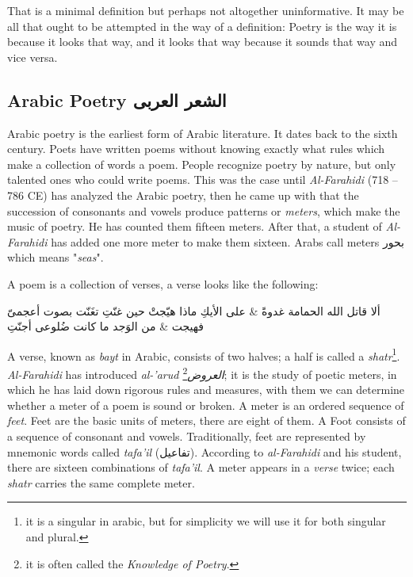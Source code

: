\documentclass[12pt]{report}
\begin{document}
That is a minimal definition but perhaps not altogether uninformative. It may be all that ought to be attempted in the way of a definition: Poetry is the way it is because it looks that way, and it looks that way because it sounds that way and vice versa.



\subsection{Arabic Poetry \textarabic{الشعر العربى}}
Arabic poetry is the earliest form of Arabic literature. It dates back to the sixth century. Poets have written poems without knowing exactly what rules which make a collection of words a poem. People recognize poetry by nature, but only talented ones who could write poems. %
This was the case until \textit{Al-Farahidi} (718 – 786 CE) has analyzed the
Arabic poetry, then he came up with that the succession of consonants and vowels
produce patterns or \textit{meters}, which make the music of poetry.  He has
counted them fifteen meters.  After that, a student of \textit{Al-Farahidi} has
added one more meter to make them sixteen. Arabs call meters \textarabic{بحور}
which means "\textit{seas}".

\bigskip

A poem is a collection of verses, a verse looks like the following:%

\vspace{0.5cm}
\begin{Arabic}
  \begin{traditionalpoem*}

    ألا قاتل الله الحمامة غدوةً \quad & \quad على الأيكِ ماذا هيّجتْ حين غنّتِ
    تغَنّت بصوت أعجمىّ فهيجت  \quad & \quad من الوَجد ما كانت ضُلوعى أجنّتِ
  \end{traditionalpoem*}
\end{Arabic}%
\vspace{0.5cm}

A verse, known as \textit{bayt} in Arabic, consists of two halves; a half is
called a \textit{shatr}\footnote{it is a singular in arabic, but for simplicity
we will use it for both singular and plural.}. %
\textit{Al-Farahidi} has introduced \textit{al-'arud
\textarabic{العروض}}\footnote{it is often called the \textit{Knowledge of
Poetry}.}; it is the study of poetic meters, in which he has laid down rigorous
rules and measures, with them we can determine whether a meter of a poem is sound
or broken. A meter is an ordered sequence of \textit{feet}. Feet are the basic
units of meters, there are eight of them. A Foot consists of a sequence of
consonant and vowels. Traditionally, feet are represented by mnemonic words
called \textit{tafa'il} (\textarabic{تفاعيل}).  According to \textit{al-Farahidi}
and his student, there are sixteen combinations of \textit{tafa'il}. A meter
appears in a \textit{verse} twice; each \textit{shatr} carries the same complete
meter.%
\end{document}
